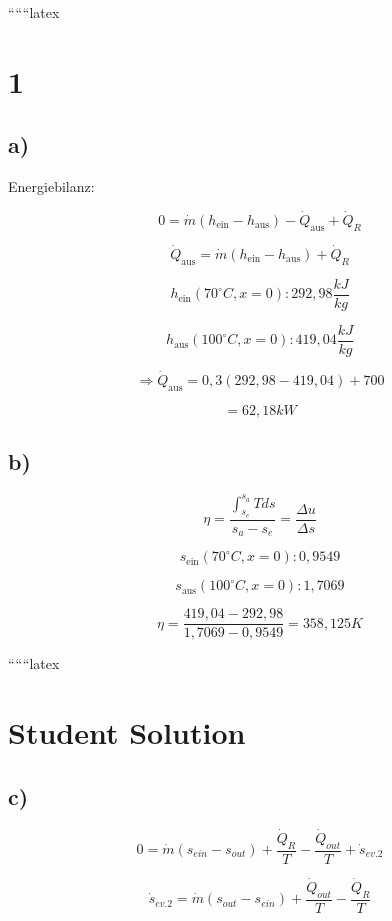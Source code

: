 
``````latex


\section*{1}
\subsection*{a)}
Energiebilanz:

\[
0 = \dot{m} (h_{\text{ein}} - h_{\text{aus}}) - \dot{Q}_{\text{aus}} + \dot{Q}_R
\]

\[
\dot{Q}_{\text{aus}} = \dot{m} (h_{\text{ein}} - h_{\text{aus}}) + \dot{Q}_R
\]

\[
h_{\text{ein}} (70^\circ C, x=0) : 292{,}98 \frac{kJ}{kg}
\]

\[
h_{\text{aus}} (100^\circ C, x=0) : 419{,}04 \frac{kJ}{kg}
\]

\[
\Rightarrow \dot{Q}_{\text{aus}} = 0{,}3 (292{,}98 - 419{,}04) + 700
\]

\[
= 62{,}18 kW
\]

\subsection*{b)}
\[
\eta = \frac{\int_{s_e}^{s_a} T ds}{s_a - s_e} = \frac{\Delta u}{\Delta s}
\]

\[
s_{\text{ein}} (70^\circ C, x=0) : 0{,}9549
\]

\[
s_{\text{aus}} (100^\circ C, x=0) : 1{,}7069
\]

\[
\eta = \frac{419{,}04 - 292{,}98}{1{,}7069 - 0{,}9549} = 358{,}125 K
\]

``````latex


\section*{Student Solution}

\subsection*{c)}

\begin{equation*}
0 = \dot{m} (s_{ein} - s_{out}) + \frac{\dot{Q}_R}{T} - \frac{\dot{Q}_{out}}{T} + \dot{s}_{ev.2}
\end{equation*}

\begin{equation*}
\dot{s}_{ev.2} = \dot{m} (s_{out} - s_{ein}) + \frac{\dot{Q}_{out}}{T} - \frac{\dot{Q}_R}{T}
\end{equation*}

